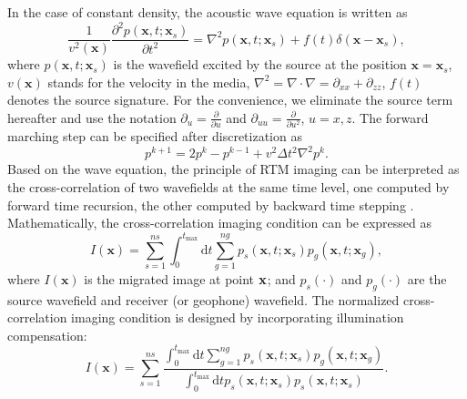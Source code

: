 In the case of constant density, the acoustic wave equation is written as
\begin{equation}\label{eq:scalar_wav}
\frac{1}{v^2(\textbf{x})}\frac{\partial^2 p(\textbf{x},t;\textbf{x}_s)}{\partial t^2}=\nabla^2 p(\textbf{x},t;\textbf{x}_s)+f(t)\delta(\textbf{x}-\textbf{x}_s),
\end{equation}
where $p(\textbf{x},t;\textbf{x}_s)$ is the wavefield excited by the source at the position $\textbf{x}=\textbf{x}_s$,  $v(\textbf{x})$ stands for the velocity in the media, $\nabla^2=\nabla\cdot\nabla=\partial_{xx}+\partial_{zz}$, $f(t)$ denotes the source signature. For the convenience, we eliminate the source term hereafter and use the notation $\partial_u=\frac{\partial}{\partial u}$ and $\partial_{uu}=\frac{\partial}{\partial u^2}$, $u=x,z$. The forward marching step can be specified after discretization as
\begin{equation}\label{eq:forward}
p^{k+1}=2p^{k}-p^{k-1}+v^2\Delta t^2 \nabla^2 p^{k}.
\end{equation}
Based on the wave equation, the principle of RTM imaging can be interpreted as the cross-correlation of two wavefields at the same time level, one computed by forward time recursion, the other computed by backward time stepping \citep{symes2007reverse}.
 Mathematically, the cross-correlation imaging condition can be expressed as
\begin{equation}
I(\textbf{x})=\sum_{s=1}^{ns}\int_{0}^{t_{\max}}\mathrm{d}t \sum_{g=1}^{ng} p_s(\textbf{x},t;\textbf{x}_s)p_g(\textbf{x},t;\textbf{x}_g),
\end{equation}
where $I(\textbf{x})$ is the migrated image at point ${\bf x}$; and $p_s(\cdot)$ and $p_g(\cdot)$ are the source wavefield and receiver (or geophone) wavefield. The normalized cross-correlation imaging condition is designed by incorporating illumination compensation:
\begin{equation}
I(\textbf{x})=\sum_{s=1}^{ns}\frac{\int_{0}^{t_{\max}}\mathrm{d}t\sum_{g=1}^{ng} p_s(\textbf{x},t;\textbf{x}_s)p_g(\textbf{x},t;\textbf{x}_g)}{\int_{0}^{t_{\max}}\mathrm{d}t p_s(\textbf{x},t;\textbf{x}_s)p_s(\textbf{x},t;\textbf{x}_s)}.
\end{equation}

